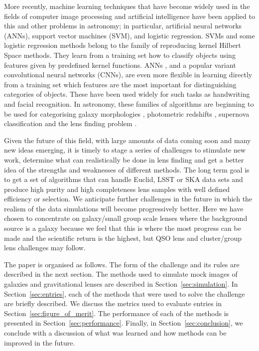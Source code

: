\documentclass{aa}
\begin{document}
More recently, machine learning techniques that have become widely used in the fields of computer image processing and artificial intelligence have been applied to this  and other problems in astronomy; in particular, artificial neural networks (ANNs), support vector machines (SVM), and logistic regression.  SVMs and some logistic regression methods belong to the family of reproducing kernel Hilbert Space methods. They learn from a training set how to classify objects using features given by predefined kernel functions.  ANNs , and a popular variant convolutional neural networks (CNNs),  are even more flexible in learning directly from a training set which features are the most important for distinguishing categories of objects.  These have been used widely for such tasks as handwriting and facial recognition.  In astronomy, these families of algorithms are beginning to be used for categorising galaxy morphologies \citep{2015MNRAS.450.1441D}, photometric redshifts \citep{2017MNRAS.465.1959C,2016PASP..128j4502S,2017NewA...51..169S}, supernova classification \citep{2016ApJS..225...31L} and the lens finding problem \citep{2017arXiv170207675P,2017MNRAS.471..167J,2017MNRAS.465.4325O,2017AandA...597A.135B,hartley2017support}.

Given the future of this field, with large amounts of data coming soon and many new ideas emerging, it is timely to stage a series of challenges to stimulate new work, determine what can realistically be done in lens finding and get a better idea of the strengths and weaknesses of different methods.  The long term goal is to get a set of algorithms that can handle Euclid, LSST or SKA data sets and produce high purity and high completeness lens samples with well defined efficiency or selection.  We anticipate further challenges in the future in which the realism of the data simulations will become progressively better.  Here we have chosen to concentrate on galaxy/small group scale lenses where the background source is a galaxy because we feel that this is where the most progress can be made and the scientific return is the highest, but QSO lens and cluster/group lens challenges may follow.

The paper is organised as follows.  The form of the challenge and its rules are described in the next section.  The methods used to simulate mock images of galaxies and gravitational lenses are described in Section~\ref{sec:simulation}.  In Section~\ref{sec:entries}, each of the methods that were used to solve the challenge are briefly described.  We discuss the metrics used to evaluate entries in Section~\ref{sec:figure_of_merit}.  The performance of each of the methods is presented in Section~\ref{sec:performance}.  Finally,  in Section~\ref{sec:conclusion}, we conclude with a discussion of what was learned and how methods can be improved in the future.
\end{document}
